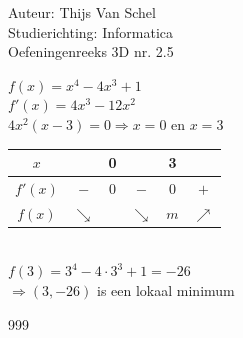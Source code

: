\documentclass[a4paper]{article}
\begin{document}
  
\noindent \large Auteur: Thijs Van Schel \\
\noindent \large Studierichting: Informatica\\
\noindent \large Oefeningenreeks 3D nr. 2.5\\

\medskip

\normalsize

$f(x) = x^4-4x^3+1$\\

$f'(x) = 4x^3-12x^2$\\

$4x^2(x-3) = 0 \Rightarrow x = 0$ en $x = 3$\\

\begin{tabular}{c|ccccc}
$x$ &  & 0 & & 3 &  \\ \hline
$f'(x)$ &  $-$ & $0$ & $-$ & $0$  &  $+$  \\ \hline
$f(x)$  & $\searrow$  &  &$\searrow$ & $m$& $\nearrow$\\
\end{tabular}\\

$f(3) = 3^4-4\cdot 3^3 + 1 = -26$\\

$\Rightarrow (3,-26)$ is een lokaal minimum\\

\begin{thebibliography}{999}
\end{thebibliography}
\end{document}
